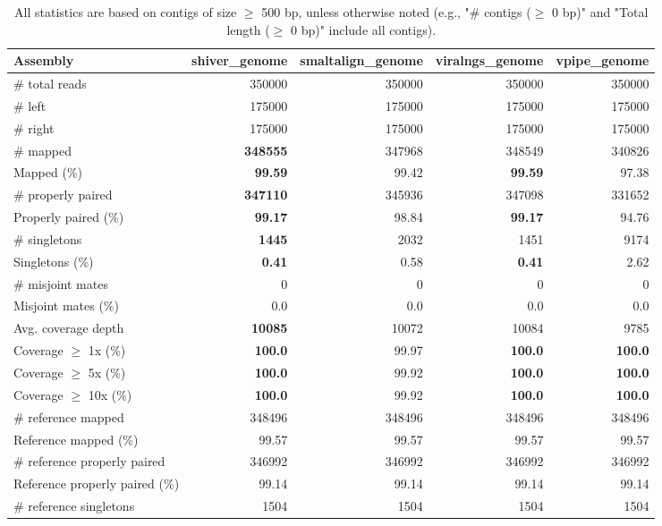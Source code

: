 \documentclass[12pt,a4paper]{article}
\begin{document}
\begin{table}[ht]
\begin{center}
\caption{All statistics are based on contigs of size $\geq$ 500 bp, unless otherwise noted (e.g., "\# contigs ($\geq$ 0 bp)" and "Total length ($\geq$ 0 bp)" include all contigs).}
\begin{tabular}{|l*{4}{|r}|}
\hline
Assembly & shiver\_genome & smaltalign\_genome & viralngs\_genome & vpipe\_genome \\ \hline
\# total reads & 350000 & 350000 & 350000 & 350000 \\ \hline
\# left & 175000 & 175000 & 175000 & 175000 \\ \hline
\# right & 175000 & 175000 & 175000 & 175000 \\ \hline
\# mapped & {\bf 348555} & 347968 & 348549 & 340826 \\ \hline
Mapped (\%) & {\bf 99.59} & 99.42 & {\bf 99.59} & 97.38 \\ \hline
\# properly paired & {\bf 347110} & 345936 & 347098 & 331652 \\ \hline
Properly paired (\%) & {\bf 99.17} & 98.84 & {\bf 99.17} & 94.76 \\ \hline
\# singletons & {\bf 1445} & 2032 & 1451 & 9174 \\ \hline
Singletons (\%) & {\bf 0.41} & 0.58 & {\bf 0.41} & 2.62 \\ \hline
\# misjoint mates & 0 & 0 & 0 & 0 \\ \hline
Misjoint mates (\%) & 0.0 & 0.0 & 0.0 & 0.0 \\ \hline
Avg. coverage depth & {\bf 10085} & 10072 & 10084 & 9785 \\ \hline
Coverage $\geq$ 1x (\%) & {\bf 100.0} & 99.97 & {\bf 100.0} & {\bf 100.0} \\ \hline
Coverage $\geq$ 5x (\%) & {\bf 100.0} & 99.92 & {\bf 100.0} & {\bf 100.0} \\ \hline
Coverage $\geq$ 10x (\%) & {\bf 100.0} & 99.92 & {\bf 100.0} & {\bf 100.0} \\ \hline
\# reference mapped & 348496 & 348496 & 348496 & 348496 \\ \hline
Reference mapped (\%) & 99.57 & 99.57 & 99.57 & 99.57 \\ \hline
\# reference properly paired & 346992 & 346992 & 346992 & 346992 \\ \hline
Reference properly paired (\%) & 99.14 & 99.14 & 99.14 & 99.14 \\ \hline
\# reference singletons & 1504 & 1504 & 1504 & 1504 \\ \hline

\end{tabular}
\end{center}
\end{table}
\end{document}
